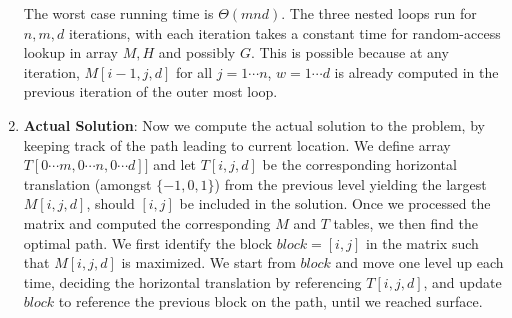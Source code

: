 \documentclass[11pt]{article}
\begin{document}
\begin{solution}
\begin{enumerate}
  \begin{algorithm}[H]

   \end{algorithm}
   The worst case running time is $\Theta(mnd)$. The three nested loops run for $n, m, d$ iterations, with each iteration takes a constant time for random-access lookup in array $M, H$ and possibly $G$. This is possible because at any iteration, $M[i-1, j, d]$ for all $j=1\cdots n$, $w=1\cdots d$ is already computed in the previous iteration of the outer most loop.
   \item \textbf{Actual Solution}: Now we compute the actual solution to the problem, by keeping track of the path leading to current location. We define array $T[0\cdots m, 0\cdots n, 0\cdots d]]$ and let $T[i, j, d]$ be the corresponding horizontal translation (amongst $\{ -1, 0, 1 \}$) from the previous level yielding the largest $M[i, j, d]$, should $[i, j]$ be included in the solution. Once we processed the matrix and computed the corresponding $M$ and $T$ tables, we then find the optimal path. We first identify the block $block = [i, j]$ in the matrix such that $M[i, j, d]$ is maximized. We start from $block$ and move one level up each time, deciding the horizontal translation by referencing $T[i, j, d]$, and update $block$ to reference the previous block on the path, until we reached surface.


   \begin{algorithm}[H]



\end{algorithm}
\end{enumerate}
\end{solution}
\end{document}
